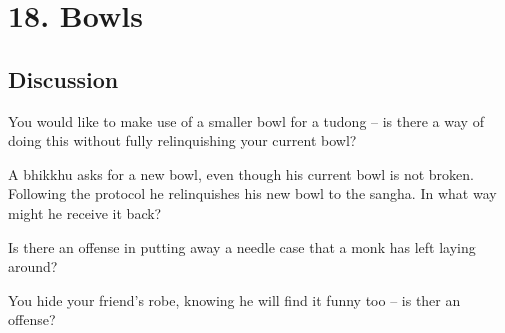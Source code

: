 \chapter{18. Bowls}
\renewcommand*{\theChapterTitle}{18. Bowls}

\section*{Discussion}


You would like to make use of a smaller bowl for a tudong – is there a way of
doing this without fully relinquishing your current bowl?

\bigskip



A bhikkhu asks for a new bowl, even though his current bowl is not broken.
Following the protocol he relinquishes his new bowl to the sangha. In what way
might he receive it back?

\bigskip



Is there an offense in putting away a needle case that a monk has left laying around? 

\bigskip


You hide your friend's robe, knowing he will find it funny too – is ther an offense?

\bigskip



